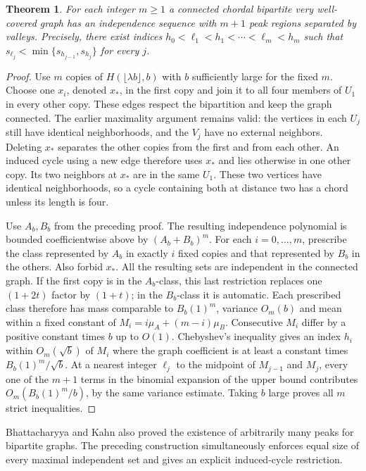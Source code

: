 \documentclass[11pt,a4paper]{article}
\newtheorem{theorem}{Theorem}[section]
\theoremstyle{remark}\newtheorem{remark}[theorem]{Remark}
\numberwithin{equation}{section}
\begin{document}
\begin{theorem}\label{thm:bipartite-many-peaks}
For each integer $m\ge1$ a connected chordal bipartite very well-covered graph
has an independence sequence with $m+1$ peak regions separated by valleys.
Precisely, there exist indices
$h_0<\ell_1<h_1<\cdots<\ell_m<h_m$ such that
$s_{\ell_j}<\min\{s_{h_{j-1}},s_{h_j}\}$ for every $j$.
\end{theorem}
\begin{proof}
Use $m$ copies of $H(\lfloor\lambda b\rfloor,b)$ with
$b$ sufficiently large for the fixed $m$. Choose one $x_i$, denoted $x_*$,
in the first copy and join it to all four members of $U_1$ in every other
copy. These edges respect the bipartition and keep the graph connected.
The earlier maximality argument remains valid: the vertices in each $U_j$
still have identical neighborhoods, and the $V_j$ have no external neighbors.
Deleting $x_*$ separates the other copies from the first and from each other.
An induced cycle using a new edge therefore uses $x_*$ and lies otherwise
in one other copy. Its two neighbors at $x_*$ are in the same $U_1$.
These two vertices have identical neighborhoods, so a cycle containing
both at distance two has a chord unless its length is four.

Use $A_b,B_b$ from the preceding proof. The resulting independence
polynomial is bounded coefficientwise above by $(A_b+B_b)^m$.
For each $i=0,\ldots,m$, prescribe the class represented by $A_b$ in
exactly $i$ fixed copies and that represented by $B_b$ in the others.
Also forbid $x_*$. All the resulting sets are independent in the
connected graph. If the first copy is in the $A_b$-class, this last
restriction replaces one $(1+2t)$ factor by $(1+t)$; in the $B_b$-class
it is automatic. Each prescribed class therefore has mass comparable to
$B_b(1)^m$, variance $O_m(b)$ and mean within a fixed constant of
$M_i=i\mu_A+(m-i)\mu_B$.
Consecutive $M_i$ differ by a positive constant times $b$ up to $O(1)$.
Chebyshev's inequality gives an index $h_i$ within $O_m(\sqrt b)$ of
$M_i$ where the graph coefficient is at least a constant times
$B_b(1)^m/\sqrt b$. At a nearest integer $\ell_j$ to the midpoint of
$M_{j-1}$ and $M_j$, every one of the $m+1$ terms in the binomial expansion
of the upper bound contributes $O_m(B_b(1)^m/b)$, by the same variance
estimate. Taking $b$ large proves all $m$ strict inequalities.
\end{proof}
Bhattacharyya and Kahn also proved the existence of arbitrarily many
peaks for bipartite graphs. The preceding construction simultaneously
enforces equal size of every maximal independent set and gives an
explicit induced-cycle restriction.
\end{document}
